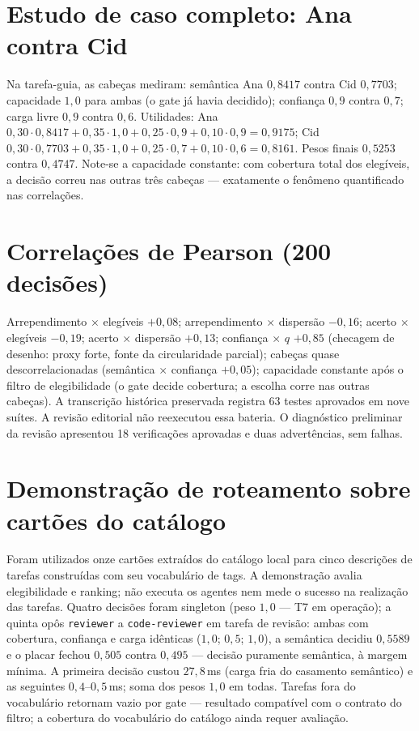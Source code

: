 \documentclass[12pt,openany,oneside,a4paper,brazil,chapter=TITLE]{abntex2}
\begin{document}
\section{Estudo de caso completo: Ana contra Cid}
Na tarefa-guia, as cabeças mediram: semântica Ana $0{,}8417$ contra Cid $0{,}7703$; capacidade $1{,}0$ para ambas (o gate já havia decidido); confiança $0{,}9$ contra $0{,}7$; carga livre $0{,}9$ contra $0{,}6$. Utilidades: Ana $0{,}30\cdot0{,}8417+0{,}35\cdot1{,}0+0{,}25\cdot0{,}9+0{,}10\cdot0{,}9=0{,}9175$; Cid $0{,}30\cdot0{,}7703+0{,}35\cdot1{,}0+0{,}25\cdot0{,}7+0{,}10\cdot0{,}6=0{,}8161$. Pesos finais $0{,}5253$ contra $0{,}4747$. Note-se a capacidade constante: com cobertura total dos elegíveis, a decisão correu nas outras três cabeças --- exatamente o fenômeno quantificado nas correlações.
\section{Correlações de Pearson (200 decisões)}
Arrependimento $\times$ elegíveis $+0{,}08$; arrependimento $\times$ dispersão $-0{,}16$; acerto $\times$ elegíveis $-0{,}19$; acerto $\times$ dispersão $+0{,}13$; confiança $\times$ $q$ $+0{,}85$ (checagem de desenho: proxy forte, fonte da circularidade parcial); cabeças quase descorrelacionadas (semântica $\times$ confiança $+0{,}05$); capacidade constante após o filtro de elegibilidade (o gate decide cobertura; a escolha corre nas outras cabeças). A transcrição histórica preservada registra 63 testes aprovados em nove suítes. A revisão editorial não reexecutou essa bateria. O diagnóstico preliminar da revisão apresentou 18 verificações aprovadas e duas advertências, sem falhas.



\section{Demonstração de roteamento sobre cartões do catálogo}
Foram utilizados onze cartões extraídos do catálogo local para cinco descrições de tarefas construídas com seu vocabulário de tags. A demonstração avalia elegibilidade e ranking; não executa os agentes nem mede o sucesso na realização das tarefas. Quatro decisões foram singleton (peso $1{,}0$ --- T7 em operação); a quinta opôs \texttt{reviewer} a \texttt{code-reviewer} em tarefa de revisão: ambas com cobertura, confiança e carga idênticas ($1{,}0$; $0{,}5$; $1{,}0$), a semântica decidiu $0{,}5589$ e o placar fechou $0{,}505$ contra $0{,}495$ --- decisão puramente semântica, à margem mínima. A primeira decisão custou $27{,}8$\,ms (carga fria do casamento semântico) e as seguintes $0{,}4$--$0{,}5$\,ms; soma dos pesos $1{,}0$ em todas. Tarefas fora do vocabulário retornam vazio por gate --- resultado compatível com o contrato do filtro; a cobertura do vocabulário do catálogo ainda requer avaliação.
\end{document}
